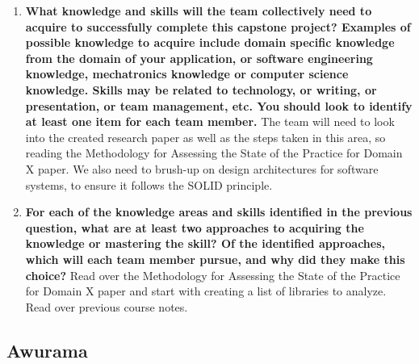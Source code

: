 \begin{enumerate}
  \item \textbf{What knowledge and skills will the team collectively need to acquire to
  successfully complete this capstone project?  Examples of possible knowledge
  to acquire include domain specific knowledge from the domain of your
  application, or software engineering knowledge, mechatronics knowledge or
  computer science knowledge.  Skills may be related to technology, or writing,
  or presentation, or team management, etc.  You should look to identify at
  least one item for each team member.}
  The team will need to look into the created research paper as well as the steps taken in this area, so reading the Methodology for Assessing the State of the Practice for Domain X paper. We also need to brush-up on design architectures for software systems, to ensure it follows the SOLID principle. 
  \item \textbf{For each of the knowledge areas and skills identified in the previous
  question, what are at least two approaches to acquiring the knowledge or
  mastering the skill?  Of the identified approaches, which will each team
  member pursue, and why did they make this choice?}
  Read over the Methodology for Assessing the State of the Practice for Domain X paper and start with creating a list of libraries to analyze. Read over previous course notes.
\end{enumerate}
\subsection*{Awurama}

